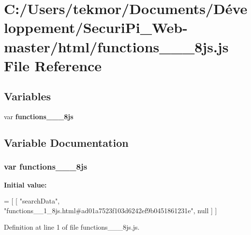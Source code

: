 \section{C\+:/\+Users/tekmor/\+Documents/\+Développement/\+Securi\+Pi\+\_\+\+Web-\/master/html/functions\+\_\+\+\_\+\_\+8js.js File Reference}
\label{functions____1__8js_8js}
\subsection*{Variables}
\begin{DoxyCompactItemize}
\item 
var {\bf functions\+\_\+\+\_\+\_\+8js}
\end{DoxyCompactItemize}


\subsection{Variable Documentation}
\subsubsection[{functions\+\_\+\+\_\+1\+\_\+8js}]{\setlength{\rightskip}{0pt plus 5cm}var functions\+\_\+\+\_\+\_\+8js}\label{functions____1__8js_8js_a52e4bb7f024fcc33afd51232b41cc49b}
{\bfseries Initial value\+:}
\begin{DoxyCode}
=
[
    [ \textcolor{stringliteral}{"searchData"}, \textcolor{stringliteral}{"functions\_\_1\_8js.html#ad01a7523f103d6242ef9b0451861231e"}, null ]
]
\end{DoxyCode}


Definition at line 1 of file functions\+\_\+\+\_\+\_\+8js.\+js.

